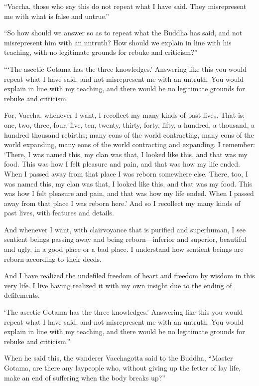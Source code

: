 \documentclass[12pt,openany]{book}%
\begin{document}
“Vaccha, those who say this do not repeat what I have said. They misrepresent me with what is false and untrue.” 

“So how should we answer so as to repeat what the Buddha has said, and not misrepresent him with an untruth? How should we explain in line with his teaching, with no legitimate grounds for rebuke and criticism?” 

“‘The ascetic Gotama has the three knowledges.’ Answering like this you would repeat what I have said, and not misrepresent me with an untruth. You would explain in line with my teaching, and there would be no legitimate grounds for rebuke and criticism. 

For, Vaccha, whenever I want, I recollect my many kinds of past lives. That is: one, two, three, four, five, ten, twenty, thirty, forty, fifty, a hundred, a thousand, a hundred thousand rebirths; many eons of the world contracting, many eons of the world expanding, many eons of the world contracting and expanding. I remember: ‘There, I was named this, my clan was that, I looked like this, and that was my food. This was how I felt pleasure and pain, and that was how my life ended. When I passed away from that place I was reborn somewhere else. There, too, I was named this, my clan was that, I looked like this, and that was my food. This was how I felt pleasure and pain, and that was how my life ended. When I passed away from that place I was reborn here.’ And so I recollect my many kinds of past lives, with features and details. 

And whenever I want, with clairvoyance that is purified and superhuman, I see sentient beings passing away and being reborn—inferior and superior, beautiful and ugly, in a good place or a bad place. I understand how sentient beings are reborn according to their deeds. 

And I have realized the undefiled freedom of heart and freedom by wisdom in this very life. I live having realized it with my own insight due to the ending of defilements. 

‘The ascetic Gotama has the three knowledges.’ Answering like this you would repeat what I have said, and not misrepresent me with an untruth. You would explain in line with my teaching, and there would be no legitimate grounds for rebuke and criticism.” 

When he said this, the wanderer Vacchagotta said to the Buddha, “Master Gotama, are there any laypeople who, without giving up the fetter of lay life, make an end of suffering when the body breaks up?” 
\end{document}
